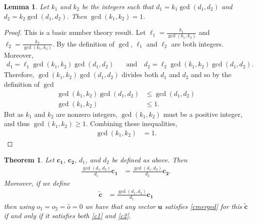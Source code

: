 \documentclass[11pt]{article}
\newcommand{\vect}[1]{\mathbf{#1}}
\newtheorem*{theorem*}{Theorem}
\newtheorem*{lemma*}{Lemma}
\begin{document}
\begin{lemma*}
Let $k_1$ and $k_2$ be the integers such that $d_1 = k_1\gcd(d_1, d_2)$ and $d_2 = k_2\gcd(d_1,d_2)$. Then $\gcd(k_1,k_2) = 1$.
\end{lemma*}

\begin{proof}
This is a basic number theory result. Let $\ell_1 = \frac{k_1}{\gcd(k_1,k_2)}$ and $\ell_2 = \frac{k_2}{\gcd(k_1,k_2)}$. By the definition of $\gcd$, $\ell_1$ and $\ell_2$ are both integers. Moreover, \begin{align*}d_1 = \ell_1 \gcd(k_1,k_2) \gcd(d_1, d_2)\quad&\text{and}\quad d_2 = \ell_2 \gcd(k_1, k_2) \gcd(d_1, d_2).\end{align*} Therefore, $\gcd(k_1, k_2) \gcd(d_1, d_2)$ divides both $d_1$ and $d_2$ and so by the definition of $\gcd$
\begin{align*}
\gcd(k_1, k_2) \gcd(d_1, d_2) &\leq \gcd(d_1, d_2) \\
\gcd(k_1, k_2) &\leq 1.
\end{align*}
But as $k_1$ and $k_2$ are nonzero integers, $\gcd(k_1,k_2)$ must be a positive integer, and thus $\gcd(k_1,k_2) \geq 1$. Combining these inequalities,
\begin{align*}
\gcd(k_1, k_2) &= 1.
\end{align*}
\end{proof}

\begin{theorem*}
Let $\vect{c_1}$, $\vect{c_2}$, $d_1$, and $d_2$ be defined as above. Then
\begin{align*}
\frac{\gcd(d_1, d_2)}{d_1} \vect{c_1} &= \frac{\gcd(d_1, d_2)}{d_2} \vect{c_2}.
\end{align*}
Moreover, if we define 
\begin{align}
\widetilde{\vect{c}} &= \frac{\gcd(d_1, d_2)}{d_1} \vect{c_1} \label{ctilde-def}
\end{align}
then using $o_1 = o_2 = \widehat{o} = 0$ we have that any vector $\vect{u}$ satisfies \eqref{cmerged} for this $\widetilde{\vect{c}}$ if and only if it satisfies both \eqref{c1} and \eqref{c2}.
\end{theorem*}
\end{document}
